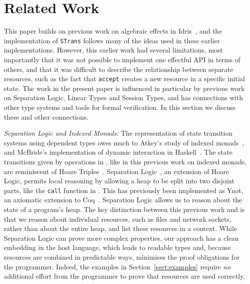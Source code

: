 
\section{Related Work}

This paper builds on previous work on algebraic effects in
Idris~\citep{brady-eff2013,brady-tfp14}, and the implementation of
\texttt{STrans} follows many of the ideas used in these earlier
implementations. However, this earlier work had several limitations, most
importantly that it was not possible to implement one effectful API in
terms of others, and that it was difficult to describe the relationship
between separate resources, such as the fact that \texttt{accept} creates
a new resource in a specific initial state. The work in the present paper is
influenced in particular by previous work on Separation Logic, Linear Types 
and Session Types, and has connections with other type systems and tools
for formal verification. In this section we discuss these and other
connections.

\emph{\textsf{Separation Logic and Indexed Monads:}}
%
The representation of state transition systems using dependent types owes much
to Atkey's study of indexed monads~\citep{atkey-param}, and McBride's
implementation of dynamic interaction in Haskell~\citep{mcbride-kleisli}.  The
state transitions given by operations in \states{}, like in this previous
work on indexed monads, are reminiscent of Hoare Triples~\citep{hoarelogic}. 
Separation Logic~\citep{reynolds2002}, an extension of Hoare Logic, 
permits local reasoning by allowing a heap to be split into two disjoint
parts, like the \texttt{call} function in
\states{}. This has previously been implemented as Ynot, an axiomatic extension
to Coq~\citep{ynot08}. 
Separation Logic allows us to reason about the state of a program's heap.  The
key distinction between this previous work and \states{} is that we reason
about individual resources, such as files and network sockets, rather than
about the entire heap, and list these resources in a context.
While Separation Logic can prove more complex properties, our
approach has a clean embedding in the host language, which
leads to readable types and, because resources are combined in predictable
ways, minimises the proof obligations for the programmer. Indeed, the examples
in Section~\ref{sect:examples} require \emph{no} additional effort
from the programmer to prove that resources are used correctly.

